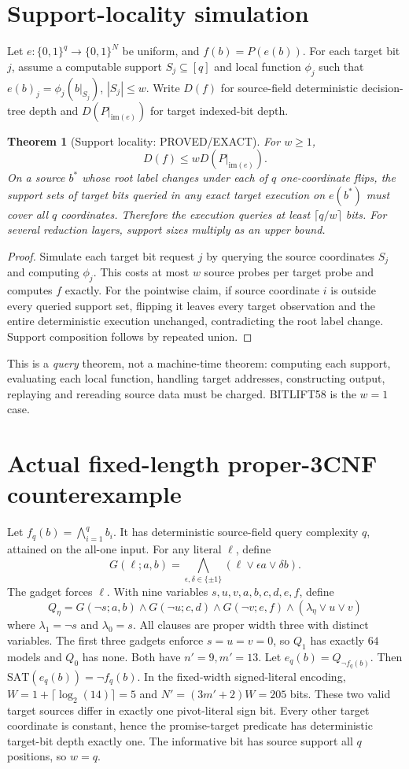 \documentclass[11pt]{article}
\newtheorem{theorem}{Theorem}
\begin{document}
\section{Support-locality simulation}
Let \(e:\{0,1\}^q\to\{0,1\}^N\) be uniform, and \(f(b)=P(e(b))\). For each target bit \(j\), assume a computable support \(S_j\subseteq[q]\) and local function \(\phi_j\) such that \(e(b)_j=\phi_j(b|_{S_j})\), \(|S_j|\le w\). Write \(D(f)\) for source-field deterministic decision-tree depth and \(D(P|_{\mathrm{im}(e)})\) for target indexed-bit depth.

\begin{theorem}[Support locality: PROVED/EXACT]
For \(w\ge1\),
\[
D(f)\le w D(P|_{\mathrm{im}(e)}).
\]
On a source \(b^*\) whose root label changes under each of \(q\) one-coordinate flips, the support sets of target bits queried in any exact target execution on \(e(b^*)\) must cover all \(q\) coordinates. Therefore the execution queries at least \(\lceil q/w\rceil\) bits. For several reduction layers, support sizes multiply as an upper bound.
\end{theorem}
\begin{proof}
Simulate each target bit request \(j\) by querying the source coordinates \(S_j\) and computing \(\phi_j\). This costs at most \(w\) source probes per target probe and computes \(f\) exactly. For the pointwise claim, if source coordinate \(i\) is outside every queried support set, flipping it leaves every target observation and the entire deterministic execution unchanged, contradicting the root label change. Support composition follows by repeated union.
\end{proof}
This is a \emph{query} theorem, not a machine-time theorem: computing each support, evaluating each local function, handling target addresses, constructing output, replaying and rereading source data must be charged. BITLIFT58 is the \(w=1\) case.

\section{Actual fixed-length proper-3CNF counterexample}
Let \(f_q(b)=\bigwedge_{i=1}^q b_i\). It has deterministic source-field query complexity \(q\), attained on the all-one input. For any literal \(\ell\), define
\[
G(\ell;a,b)=\bigwedge_{\epsilon,\delta\in\{\pm1\}}
(\ell\lor \epsilon a\lor\delta b).
\]
The gadget forces \(\ell\). With nine variables \(s,u,v,a,b,c,d,e,f\), define
\[
Q_\eta=G(\neg s;a,b)\land G(\neg u;c,d)
\land G(\neg v;e,f)\land(\lambda_\eta\lor u\lor v)
\]
where \(\lambda_1=\neg s\) and \(\lambda_0=s\). All clauses are proper width three with distinct variables. The first three gadgets enforce \(s=u=v=0\), so \(Q_1\) has exactly \(64\) models and \(Q_0\) has none. Both have \(n'=9,m'=13\).
Let \(e_q(b)=Q_{\neg f_q(b)}\). Then \(\mathrm{SAT}(e_q(b))=\neg f_q(b)\). In the fixed-width signed-literal encoding, \(W=1+\lceil\log_2(14)\rceil=5\) and \(N'=(3m'+2)W=205\) bits. These two valid target sources differ in exactly one pivot-literal sign bit. Every other target coordinate is constant, hence the promise-target predicate has deterministic target-bit depth exactly one. The informative bit has source support all \(q\) positions, so \(w=q\).
\end{document}
